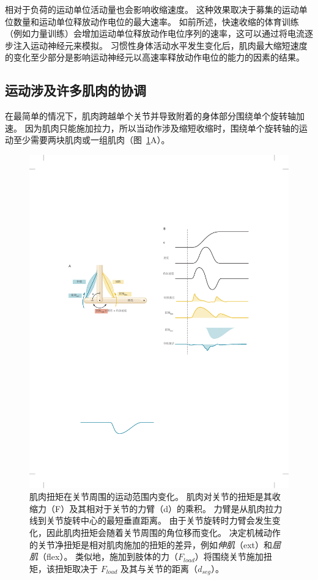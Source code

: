 相对于负荷的运动单位活动量也会影响收缩速度。
这种效果取决于募集的运动单位数量和运动单位释放动作电位的最大速率。
如前所述，快速收缩的体育训练（例如力量训练）会增加运动单位释放动作电位序列的速率，这可以通过将电流逐步注入运动神经元来模拟。
习惯性身体活动水平发生变化后，肌肉最大缩短速度的变化至少部分是影响运动神经元以高速率释放动作电位的能力的因素的结果。



\subsection{运动涉及许多肌肉的协调}

在最简单的情况下，肌肉跨越单个关节并导致附着的身体部分围绕单个旋转轴加速。
因为肌肉只能施加拉力，所以当动作涉及缩短收缩时，围绕单个旋转轴的运动至少需要两块肌肉或一组肌肉（图~\ref{fig:31_15}A）。



\begin{figure}[htbp]
	\centering
	\includegraphics[width=0.98\linewidth]{chap31/fig_31_15}
	\caption{肌肉扭矩在关节周围的运动范围内变化。
	肌肉对关节的扭矩是其收缩力（F）及其相对于关节的力臂（d）的乘积。
	力臂是从肌肉拉力线到关节旋转中心的最短垂直距离。
	由于关节旋转时力臂会发生变化，因此肌肉扭矩会随着关节周围的角位移而变化。
	决定机械动作的关节净扭矩是相对肌肉施加的扭矩的差异，例如\textit{伸肌}（ext）和\textit{屈肌}（flex）。
	类似地，施加到肢体的力（$ F_{load} $）将围绕关节施加扭矩，该扭矩取决于 $ F_{load} $ 及其与关节的距离（$ d_{seg} $）。}
	\label{fig:31_15}
\end{figure}


